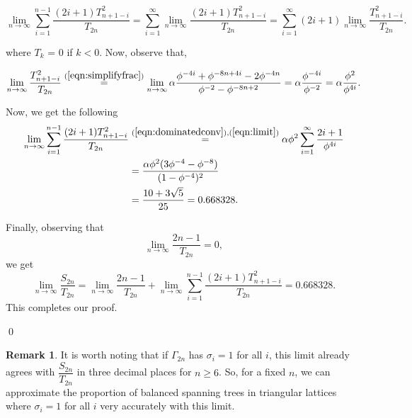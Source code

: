 \documentclass{amsart}
\theoremstyle{definition}
\newtheorem{remark}[theorem]{Remark}
\newcommand{\yandi}[1]{\marginpar{\tiny \color{red} Yandi: #1}}
\newcommand{\saugat}[1]{\marginpar{\tiny \color{blue} Saugat: #1}}
\begin{document}
\begin{equation}\label{eqn:dominatedconv}
    \lim_{n \to \infty} \sum_{i = 1}^{n-1} \frac{(2i + 1)T_{n+1-i}^2}{T_{2n}} =  \sum_{i = 1}^{\infty} \lim_{n \to \infty} \frac{(2i + 1)T_{n+1-i}^2}{T_{2n}} = \sum_{i = 1}^{\infty} (2i + 1) \lim_{n \to \infty} \frac{T_{n+1-i}^2}{T_{2n}}.
\end{equation}

\noindent where $T_k$ = 0 if $k < 0$. Now, observe that, 

\begin{align}\label{eqn:limit}
\lim_{n \to \infty} \frac{T_{n+1-i}^2}{T_{2n}} \stackrel{(\ref{eqn:simplifyfrac})}{=} \lim_{n \to \infty} \alpha \frac{\phi^{-4i} + \phi^{-8n + 4i} - 2\phi^{-4n}}{\phi^{-2} - \phi^{-8n + 2}} = \alpha \frac{\phi^{-4i}}{\phi^{-2}} = \alpha \frac{\phi^2}{\phi ^ {4i}}.
\end{align}

Now, we get the following 
\begin{align}\label{eqn:homogenval}
\lim_{n \to \infty} \sum_{i = 1}^{n - 1} \frac{(2i + 1)T_{n+1-i}^2}{T_{2n}} &\overset{(\ref{eqn:dominatedconv}), (\ref{eqn:limit})}{=} \alpha \phi^2 \sum_{i = 1}^{\infty} \frac{2i + 1}{\phi^{4i}} \\ \nonumber
&= \frac{\alpha \phi^2(3 \phi^{-4} - \phi^{-8})}{(1 - \phi^{-4})^2} \\ \nonumber
&= \frac{10 + 3 \sqrt{5}}{25} = 0.668328.
\end{align}

Finally, observing that
\[\lim_{n \to \infty} \frac{2n - 1}{T_{2n}} = 0,\]
we get
\[\lim_{n \to \infty} \frac{S_{2n}}{T_{2n}} =  \lim_{n \to \infty} \frac{2n - 1}{T_{2n}} + \lim_{n \to \infty} \sum_{i = 1}^{n - 1} \frac{(2i + 1)T_{n+1-i}^2}{T_{2n}} = 0.668328.\]
This completes our proof.

\qed

\begin{remark}
It is worth noting that if $\Gamma_{2n}$ has $\sigma_i = 1$ for all $i$, this limit already agrees with $\dfrac{S_{2n}}{T_{2n}}$ in three decimal places for $n \ge 6$. So, for a fixed $n$, we can approximate the proportion of balanced spanning trees {in triangular lattices where $\sigma_i = 1$ for all $i$} very accurately with this limit.
\end{remark}
\end{document}

